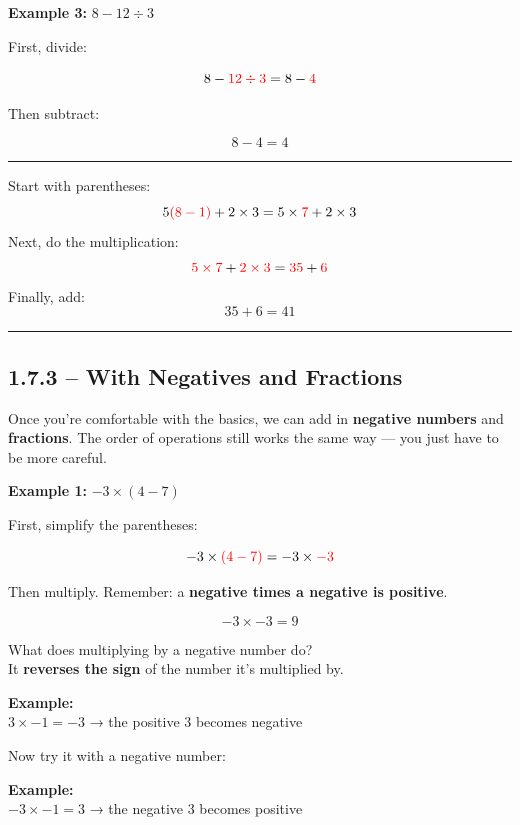 \documentclass[
  letterpaper,
  DIV=11,
  numbers=noendperiod]{scrreprt}
\begin{document}
\textbf{Example 3:} \(8 - 12 \div 3\)

First, divide:

\[
8 - \color{red}12 \div 3 \color{black} = 8 - \color{red}4
\]

Then subtract:

\[
8 - 4 = 4
\]

\begin{center}\rule{0.5\linewidth}{0.5pt}\end{center}

Start with parentheses: \[
5\color{red}(8 - 1)\color{black} + 2 \times 3 = 5 \times \color{red}7 \color{black} + 2 \times 3
\] Next, do the multiplication: \[
\color{red}5 \times 7 \color{black} + \color{red}2 \times 3 \color{black} = \color{red}35 \color{black} + \color{red}6
\] Finally, add: \[
35 + 6 = 41
\]

\begin{center}\rule{0.5\linewidth}{0.5pt}\end{center}

\subsection*{1.7.3 -- With Negatives and
Fractions}\label{with-negatives-and-fractions}

Once you're comfortable with the basics, we can add in \textbf{negative
numbers} and \textbf{fractions}. The order of operations still works the
same way --- you just have to be more careful.

\textbf{Example 1:} \(-3 \times (4 - 7)\)

First, simplify the parentheses:

\[
-3 \times \color{red}(4 - 7)\color{black} = -3 \times \color{red}-3
\]

Then multiply. Remember: a \textbf{negative times a negative is
positive}.

\[
-3 \times -3 = 9
\]

What does multiplying by a negative number do?\\
It \textbf{reverses the sign} of the number it's multiplied by.

\textbf{Example:}\\
\(3 \times -1 = -3\) → the positive 3 becomes negative

Now try it with a negative number:

\textbf{Example:}\\
\(-3 \times -1 = 3\) → the negative 3 becomes positive
\end{document}
